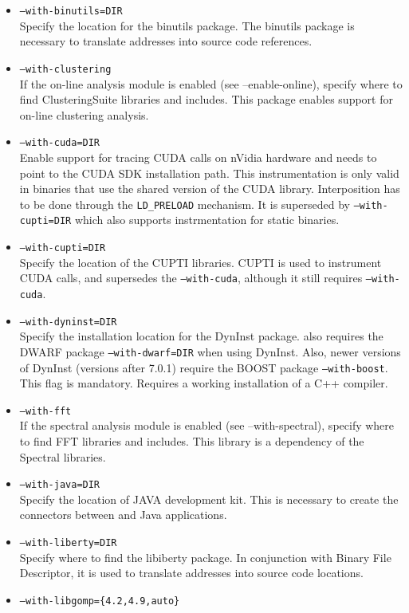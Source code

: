\begin{itemize}
	\item {\tt --with-binutils=DIR} \\
	Specify the location for the binutils package. The binutils package is necessary to translate addresses into source code references.
        \item {\tt --with-clustering} \\
        If the on-line analysis module is enabled (see --enable-online), specify where to find ClusteringSuite libraries and includes. This package enables support for on-line clustering analysis.
	\item {\tt --with-cuda=DIR} \\
	Enable support for tracing CUDA calls on nVidia hardware and needs to point to the CUDA SDK installation path. This instrumentation is only valid in binaries that use the shared version of the CUDA library. Interposition has to be done through the {\tt LD\_PRELOAD} mechanism. It is superseded by {\tt --with-cupti=DIR} which also supports instrmentation for static binaries.
	\item {\tt --with-cupti=DIR} \\
	Specify the location of the CUPTI libraries. CUPTI is used to instrument CUDA calls, and supersedes the {\tt --with-cuda}, although it still requires {\tt --with-cuda}.
	\item {\tt --with-dyninst=DIR} \\
	Specify the installation location for the DynInst package. \TRACE also requires the DWARF package {\tt --with-dwarf=DIR} when using DynInst. Also, newer versions of DynInst (versions after 7.0.1) require the BOOST package {\tt --with-boost}. This flag is mandatory. Requires a working installation of a C++ compiler.
        \item {\tt --with-fft} \\
        If the spectral analysis module is enabled (see --with-spectral), specify where to find FFT libraries and includes. This library is a dependency of the Spectral libraries.
	\item {\tt --with-java=DIR} \\
	Specify the location of JAVA development kit. This is necessary to create the connectors between \TRACE and Java applications.
	\item {\tt --with-liberty=DIR} \\
	Specify where to find the libiberty package. In conjunction with Binary File Descriptor, it is used to translate addresses into source code locations.
	\item {\tt --with-libgomp=\{4.2,4.9,auto\}}\\

\end{itemize}
